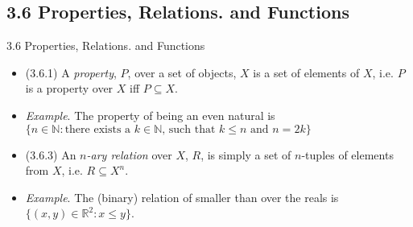 \documentclass[../slides.tex]{subfiles}
\begin{document}
\subsection{3.6 Properties, Relations. and Functions}
\begin{frame}{3.6 Properties, Relations. and Functions}

	\begin{itemize}
	
		\item (3.6.1) A \emph{property}, $P$, over a set of objects, $X$ is a set of elements of $X$, i.e. $P$ is a property over $X$ iff $P\subseteq X$.
	
		\item \emph{Example}. The property of being an even natural is $\{n\in\mathbb{N}:\text{there exists a }k\in\mathbb{N}\text{, such that }k\leq n\text{ and }n=2k\}$
		
		\item (3.6.3) An \emph{$n$-ary relation} over $X$, $R$, is simply a set of $n$-tuples of elements from $X$, i.e. $R\subseteq X^n$.
		
		\item \emph{Example}. The (binary) relation of smaller than over the reals is $\{(x,y)\in\mathbb{R}^2: x\leq y\}$.
	
	\end{itemize}

\end{frame}
\end{document}
